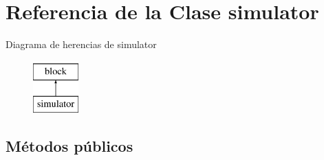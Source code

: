 \hypertarget{classsimulator}{\section{\-Referencia de la \-Clase simulator}
\label{classsimulator}
}
\-Diagrama de herencias de simulator\begin{figure}[H]
\begin{center}
\leavevmode
\includegraphics[height=2.000000cm]{classsimulator}
\end{center}
\end{figure}
\subsection*{\-Métodos públicos}
